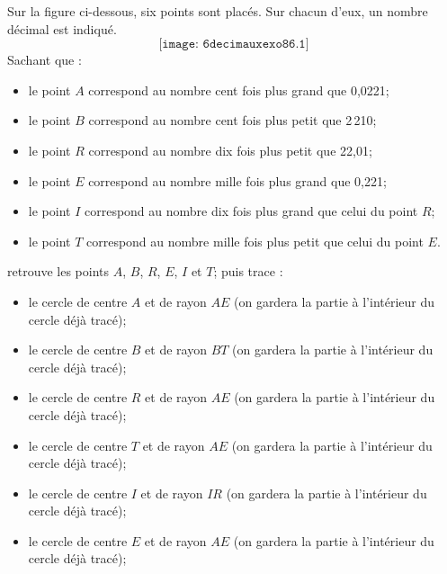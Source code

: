 Sur la figure ci-dessous, six points sont placés. Sur chacun d'eux, un
nombre décimal est indiqué.
\[\texttt{[image: 6decimauxexo86.1]}\]
Sachant que :
\begin{itemize}
\item le point $A$ correspond au nombre cent fois plus grand que 0,0221;
\item le point $B$ correspond au nombre cent fois plus petit que 2\,210;
\item le point $R$ correspond au nombre dix fois plus petit que 22,01;
\item le point $E$ correspond au nombre mille fois plus grand que 0,221;
\item le point $I$ correspond au nombre dix fois plus grand que celui
  du point $R$;
\item le point $T$ correspond au nombre mille fois plus petit que
  celui du point $E$.
\end{itemize}
retrouve les points $A$, $B$, $R$, $E$, $I$ et $T$; puis trace :
\begin{itemize}
\item le cercle de centre $A$ et de rayon $AE$ (on gardera la partie à
  l'intérieur du cercle déjà tracé);
\item le cercle de centre $B$ et de rayon $BT$ (on gardera la partie à
  l'intérieur du cercle déjà tracé);
\item le cercle de centre $R$ et de rayon $AE$ (on gardera la partie à
  l'intérieur du cercle déjà tracé);
\item le cercle de centre $T$ et de rayon $AE$ (on gardera la partie à
  l'intérieur du cercle déjà tracé);
\item le cercle de centre $I$ et de rayon $IR$ (on gardera la partie à
  l'intérieur du cercle déjà tracé);
\item le cercle de centre $E$ et de rayon $AE$ (on gardera la partie à
  l'intérieur du cercle déjà tracé);
\end{itemize}

